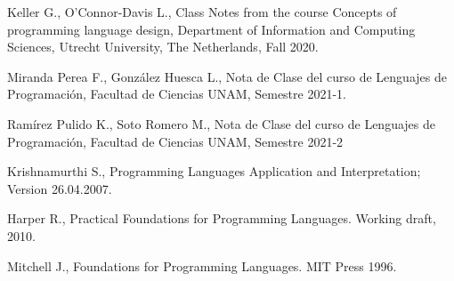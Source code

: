 \documentclass[12pt]{extarticle}
\begin{document}

\begin{thebibliography}{9}
Keller G., O'Connor-Davis L., Class Notes from the course Concepts of programming language design, Department of Information and Computing Sciences, Utrecht University, The Netherlands, Fall 2020.

Miranda Perea F., González Huesca L., Nota de Clase del curso de Lenguajes de Programación, Facultad de Ciencias UNAM, Semestre 2021-1.

Ramírez Pulido K., Soto Romero M., Nota de Clase del curso de Lenguajes de Programación, Facultad de Ciencias UNAM, Semestre 2021-2

Krishnamurthi S., Programming Languages Application and Interpretation; Version 26.04.2007.

Harper R., Practical Foundations for Programming Languages. Working draft, 2010.

Mitchell J., Foundations for Programming Languages. MIT Press 1996.



\end{thebibliography}
\end{document}

